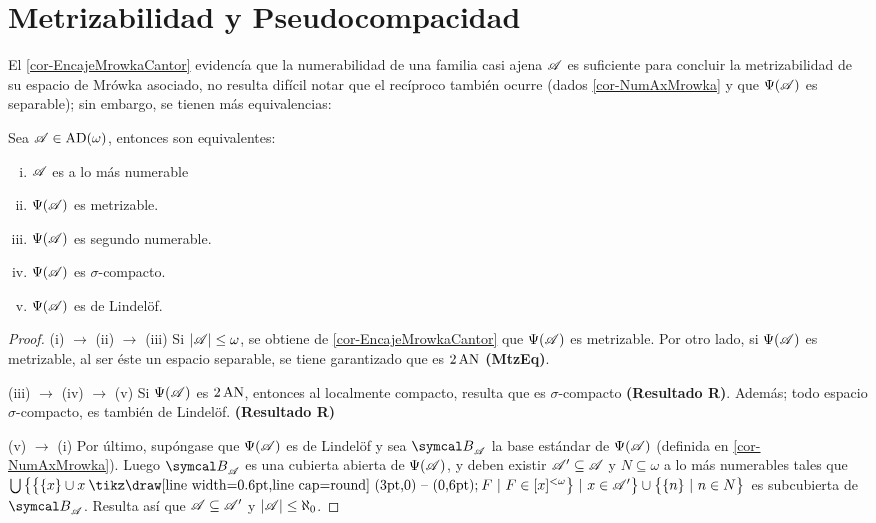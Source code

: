  \section{Metrizabilidad y Pseudocompacidad}

 El \autoref{cor-EncajeMrowkaCantor} evidencía que la numerabilidad de una familia casi ajena $\mathscr{A}$ es suficiente para concluir la metrizabilidad de su espacio de Mrówka asociado, no resulta difícil notar que el recíproco también ocurre (dados \ref{cor-NumAxMrowka} y que $\Psi(\mathscr{A})$ es separable); sin embargo, se tienen más equivalencias:
 
 \begin{proposicion}\label{prop-tra-numerable}
  Sea $\mathscr{A}\in \operatorname{AD}(\omega)$, entonces son equivalentes:
  \begin{enumerate}[i)]
   \item $\mathscr{A}$ es a lo más numerable
   \item $\Psi(\mathscr{A})$ es metrizable.
   \item $\Psi(\mathscr{A})$ es segundo numerable.
   \item $\Psi(\mathscr{A})$ es $\sigma$-compacto.
   \item $\Psi(\mathscr{A})$ es de Lindelöf.
  \end{enumerate}
 \end{proposicion}
 
 \begin{proof} 
  (i) $\rightarrow$ (ii) $\rightarrow$ (iii) Si $|\mathscr{A}| \leq \omega$, se obtiene de \ref{cor-EncajeMrowkaCantor} que $\Psi(\mathscr{A})$ es metrizable. Por otro lado, si $\Psi(\mathscr{A})$ es metrizable, al ser éste un espacio separable, se tiene garantizado que es $2\operatorname{AN}$ \textbf{(MtzEq)}.
   
  (iii) $\rightarrow$ (iv) $\to$ (v) Si $\Psi(\mathscr{A})$ es $2\operatorname{AN}$, entonces al localmente compacto, resulta que es $\sigma$-compacto \textbf{(Resultado R)}. Además; todo espacio $\sigma$-compacto, es también de Lindelöf. \textbf{(Resultado R)}
   
  (v) $\rightarrow$ (i) Por último, supóngase que $\Psi(\mathscr{A})$ es de Lindelöf y sea $\mathcal{B}_\ms{A}$ la base estándar de $\Psi(\mathscr{A})$ (definida en \ref{cor-NumAxMrowka}). Luego $\mathcal{B}_ \ms{A}$ es una cubierta abierta de $\Psi(\mathscr{A})$, y deben existir $\mathscr{A}' \subseteq \mathscr{A}$ y $N \subseteq \omega$ a lo más numerables tales que $\midcup \big\{ \big\{ \{x\} \cup x \setminus F \tq F \in [x]^{<\omega} \big\} \tq x \in \ms{A}' \big\} \cup \big\{ \{n\} \tq n \in N \big\}$ es subcubierta de $\mathcal{B}_ \ms{A}$. Resulta así que $\mathscr{A} \subseteq \mathscr{A}'$ y $|\mathscr{A}| \leq \aleph_0$.
 \end{proof}
 
